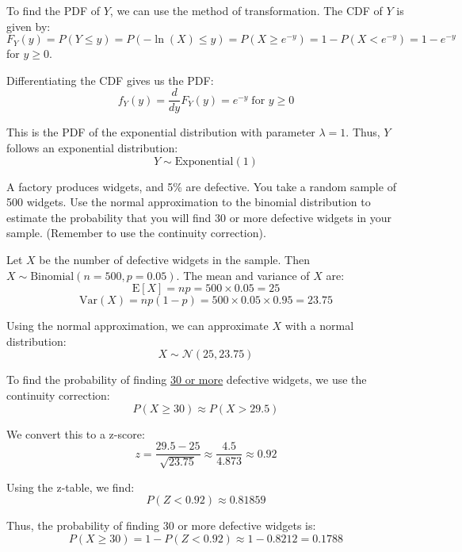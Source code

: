 \documentclass[a4paper, 10pt]{article}
\begin{document}
\begin{solution}
	To find the PDF of \( Y \), we can use the method of transformation. The CDF of \( Y \) is given by:
	\[
		F_Y(y) = P(Y \leq y) = P(-\ln(X) \leq y) = P(X \geq e^{-y}) = 1 - P(X < e^{-y}) = 1 - e^{-y}
	\]
	for \( y \geq 0 \).

	Differentiating the CDF gives us the PDF:
	\[
		\boxed{f_Y(y) = \frac{d}{dy} F_Y(y) = e^{-y}} \; \text{for } y \geq 0
	\]

	This is the PDF of the exponential distribution with parameter \( \lambda = 1 \). Thus, \( Y \) follows an exponential distribution:
	\[
		\boxed{Y \sim \text{Exponential}(1)}
	\]
\end{solution}

\begin{problem}
A factory produces widgets, and 5\% are defective. You take a random sample of 500 widgets.
Use the normal approximation to the binomial distribution to estimate the probability that you will find 30 or more defective widgets in your sample.
(Remember to use the continuity correction).
\end{problem}

\begin{solution}
	Let \( X \) be the number of defective widgets in the sample. Then \( X \sim \text{Binomial}(n=500, p=0.05) \).
	The mean and variance of \( X \) are:
	\[ \text{E}[X] = np = 500 \times 0.05 = 25 \]
	\[ \text{Var}(X) = np(1-p) = 500 \times 0.05 \times 0.95 = 23.75 \]

	Using the normal approximation, we can approximate \( X \) with a normal distribution:
	\[ X \sim \mathcal{N}(25, 23.75) \]
	
	To find the probability of finding \underline{30 or more} defective widgets, we use the continuity correction:
	\[ P(X \geq 30) \approx P(X > 29.5) \]

	We convert this to a z-score:
	\[ z = \frac{29.5 - 25}{\sqrt{23.75}} \approx \frac{4.5}{4.873} \approx 0.92 \]

	Using the z-table, we find:
	\[ P(Z < 0.92) \approx 0.81859 \]

	Thus, the probability of finding 30 or more defective widgets is:
	\[ P(X \geq 30) = 1 - P(Z < 0.92) \approx 1 - 0.8212 = \boxed{0.1788} \]
\end{solution}
\end{document}
